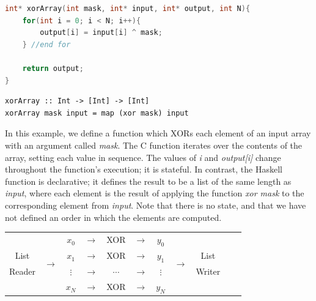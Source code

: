 \documentclass[english,onecolumn]{article}
\begin{document}
\begin{lstlisting}[language=C, caption={XORing an array in C.}, label={lst:xorC}]
int* xorArray(int mask, int* input, int* output, int N){
    for(int i = 0; i < N; i++){
        output[i] = input[i] ^ mask;
    } //end for

    return output;
}
\end{lstlisting}

\begin{lstlisting}[caption={XORing an array in Haskell.}, label={lst:xorH}]
xorArray :: Int -> [Int] -> [Int]
xorArray mask input = map (xor mask) input
\end{lstlisting}

In this example, we define a function which XORs each element of an input array with an argument called \textit{mask}. The C function iterates over the contents of the array, setting each value in sequence. The values of \textit{i} and \textit{output[i]} change throughout the function's execution; it is stateful. In contrast, the Haskell function is declarative; it defines the result to be a list of the same length as \textit{input}, where each element is the result of applying the function \textit{xor mask} to the corresponding element from \textit{input}. Note that there is no state, and that we have not defined an order in which the elements are computed.

\begin{tabular}{|c|c|c|c|c|c|c|c|c|c|c}
\cline{1-1} \cline{3-3} \cline{5-5} \cline{7-7} \cline{9-9}
& \multirow{4}{*}{$\longrightarrow$} & $x_0$ & $\longrightarrow$ & XOR & $\longrightarrow$ & $y_0$ & \multirow{4}{*}{$\longrightarrow$} & \\
\cline{3-3} \cline{5-5} \cline{7-7}
List & & $x_1$ & $\longrightarrow$ & XOR & $\longrightarrow$ & $y_1$ & & List \\
\cline{3-3} \cline{5-5} \cline{7-7}
Reader & & $\vdots$ & $\longrightarrow$ & $\cdots$ & $\longrightarrow$ & $\vdots$ & & Writer \\
\cline{3-3} \cline{5-5} \cline{7-7}
& & $x_N$ & $\longrightarrow$ & XOR & $\longrightarrow$ & $y_N$ & & \\
\cline{1-1} \cline{3-3} \cline{5-5} \cline{7-7} \cline{9-9}
\end{tabular} 
\end{document}
